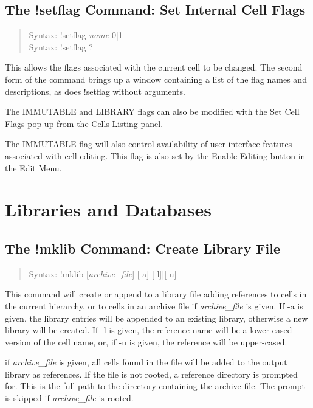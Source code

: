 \subsection{The {\cb !setflag} Command: Set Internal Cell Flags}
\begin{quote}
Syntax: {\vt !setflag {\it name} 0|1}\\
Syntax: {\vt !setflag ?}\\
\end{quote}
This allows the flags associated with the current cell to be changed. 
The second form
of the command brings up a window containing a list of the flag names
and descriptions, as does {\cb !setflag} without arguments.

The {\et IMMUTABLE} and {\et LIBRARY} flags can also be modified with
the {\cb Set Cell Flags} pop-up from the {\cb Cells Listing} panel.

The IMMUTABLE flag will also control availability of user interface
features associated with cell editing.  This flag is also set by the
{\cb Enable Editing} button in the {\cb Edit Menu}.

\section{Libraries and Databases}

\subsection{The {\cb !mklib} Command: Create Library File}
\begin{quote}
Syntax: {\vt !mklib [{\it archive\_file\/}] [-a] [-l]|[-u]}
\end{quote}
This command will create or append to a library file adding references
to cells in the current hierarchy, or to cells in an archive file if
{\it archive\_file} is given.  If {\vt -a} is given, the library
entries will be appended to an existing library, otherwise a new
library will be created.  If {\vt -l} is given, the reference name
will be a lower-cased version of the cell name, or, if {\vt -u} is
given, the reference will be upper-cased.

if {\it archive\_file} is given, all cells found in the file will be
added to the output library as references.  If the file is not rooted,
a reference directory is prompted for.  This is the full path to the
directory containing the archive file.  The prompt is skipped if
{\it archive\_file} is rooted.

